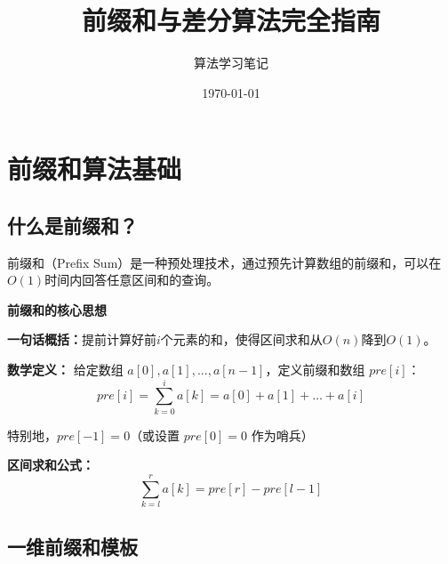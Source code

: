 \documentclass[12pt,a4paper]{article}
\title{\Huge \textbf{前缀和与差分算法完全指南}}
\author{算法学习笔记}
\date{\today}
\begin{document}
	
	\maketitle
	
	\tableofcontents
	\newpage
	
	\section{前缀和算法基础}
	
	\subsection{什么是前缀和？}
	
	前缀和（Prefix Sum）是一种预处理技术，通过预先计算数组的前缀和，可以在$O(1)$时间内回答任意区间和的查询。
	
	\begin{bluebox}
		\textbf{前缀和的核心思想}
		
		\textbf{一句话概括：}提前计算好前$i$个元素的和，使得区间求和从$O(n)$降到$O(1)$。
		
		\textbf{数学定义：}
		给定数组 $a[0], a[1], ..., a[n-1]$，定义前缀和数组 $pre[i]$：
		$$pre[i] = \sum_{k=0}^{i} a[k] = a[0] + a[1] + ... + a[i]$$
		
		特别地，$pre[-1] = 0$（或设置 $pre[0] = 0$ 作为哨兵）
		
		\textbf{区间求和公式：}
		$$\sum_{k=l}^{r} a[k] = pre[r] - pre[l-1]$$
	\end{bluebox}
	
	\subsection{一维前缀和模板}
	
\end{document}
